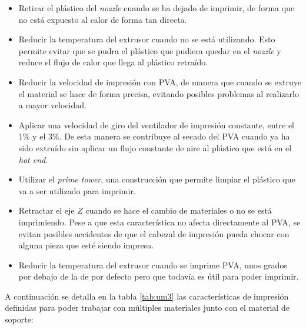 \begin{itemize}
    \item Retirar el plástico del \textit{nozzle} cuando se ha dejado de imprimir,
    de forma que no está expuesto al calor de forma tan directa.

    \item Reducir la temperatura del extrusor cuando no se está utilizando. Esto
    permite evitar que se pudra el plástico que pudiera quedar en el \textit{nozzle}
    y reduce el flujo de calor que llega al plástico retraído.

    \item Reducir la velocidad de impresión con \ac{PVA}, de manera que cuando se
    extruye el material se hace de forma precisa, evitando posibles problemas al
    realizarlo a mayor velocidad.

    \item Aplicar una velocidad de giro del ventilador de impresión constante, entre
    el 1\% y el 3\%. De esta manera se contribuye al secado del \ac{PVA} cuando ya
    ha sido extruído sin aplicar un flujo constante de aire al plástico que está
    en el \textit{hot end}.

    \item Utilizar el \textit{prime tower}, una construcción que permite limpiar
    el plástico que va a ser utilizado para imprimir.

    \item Retractar el eje $Z$ cuando se hace el cambio de materiales o no se está
    imprimiendo. Pese a que esta característica no afecta directamente al \ac{PVA},
    se evitan posibles accidentes de que el cabezal de impresión pueda chocar con
    alguna pieza que esté siendo impresa.

    \item Reducir la temperatura del extrusor cuando se imprime \ac{PVA}, unos grados
    por debajo de la de por defecto pero que todavía es útil para poder imprimir.
\end{itemize}

A continuación se detalla en la tabla \ref{tab:um3} las características de impresión
definidas para poder trabajar con múltiples materiales junto con el material de soporte:

